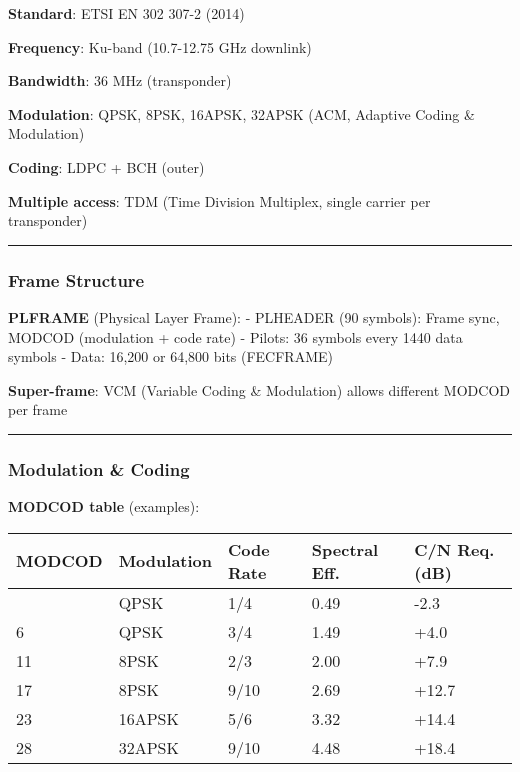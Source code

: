 \textbf{Standard}: ETSI EN 302 307-2 (2014)

\textbf{Frequency}: Ku-band (10.7-12.75 GHz downlink)

\textbf{Bandwidth}: 36 MHz (transponder)

\textbf{Modulation}: QPSK, 8PSK, 16APSK, 32APSK (ACM, Adaptive Coding \&
Modulation)

\textbf{Coding}: LDPC + BCH (outer)

\textbf{Multiple access}: TDM (Time Division Multiplex, single carrier
per transponder)

\begin{center}\rule{0.5\linewidth}{0.5pt}\end{center}

\subsubsection{Frame Structure}\label{frame-structure-1}

\textbf{PLFRAME} (Physical Layer Frame): - PLHEADER (90 symbols): Frame
sync, MODCOD (modulation + code rate) - Pilots: 36 symbols every 1440
data symbols - Data: 16,200 or 64,800 bits (FECFRAME)

\textbf{Super-frame}: VCM (Variable Coding \& Modulation) allows
different MODCOD per frame

\begin{center}\rule{0.5\linewidth}{0.5pt}\end{center}

\subsubsection{Modulation \& Coding}\label{modulation-coding-1}

\textbf{MODCOD table} (examples):

{\def\LTcaptype{} %
\begin{longtable}[]{@{}lllll@{}}
\toprule\noalign{}
MODCOD & Modulation & Code Rate & Spectral Eff. & C/N Req. (dB) \\
\midrule\noalign{}
\endhead
\bottomrule\noalign{}
\endlastfoot
1 & QPSK & 1/4 & 0.49 & -2.3 \\
6 & QPSK & 3/4 & 1.49 & +4.0 \\
11 & 8PSK & 2/3 & 2.00 & +7.9 \\
17 & 8PSK & 9/10 & 2.69 & +12.7 \\
23 & 16APSK & 5/6 & 3.32 & +14.4 \\
28 & 32APSK & 9/10 & 4.48 & +18.4 \\
\end{longtable}
}

